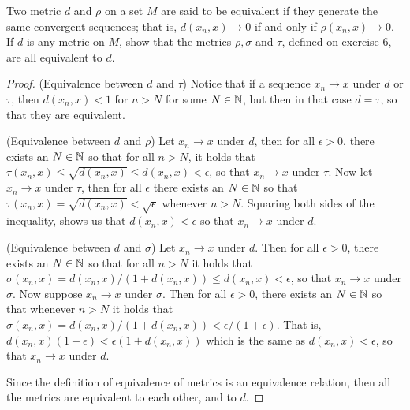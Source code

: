 \begin{exercise}{42}
Two metric $d$ and $\rho$ on a set $M$ are said to be equivalent if they generate the same convergent sequences; that is, $d(x_n,x)\to 0$ if and only if $\rho(x_n,x)\to 0$. If $d$ is any metric on $M$, show that the metrics $\rho,\sigma$ and $\tau$, defined on exercise 6, are all equivalent to $d$.
\end{exercise}
\begin{proof}
(Equivalence between $d$ and $\tau$) Notice that if a sequence $x_n\to x$ under $d$ or $\tau$, then $d(x_n,x)<1$ for $n>N$ for some $N\in\mathbb{N}$, but then in that case $d=\tau$, so that they are equivalent.

(Equivalence between $d$ and $\rho$) Let $x_n\to x$ under $d$, then for all $\epsilon>0$, there exists an $N\in\mathbb{N}$ so that for all $n>N$, it holds that $\tau(x_n,x)\leq \sqrt{d(x_n,x)}\leq d(x_n,x)<\epsilon$, so that $x_n\to x$ under $\tau$. Now let $x_n\to x$ under $\tau$, then for all $\epsilon$ there exists an $N\in\mathbb{N}$ so that $\tau(x_n,x) =\sqrt{d(x_n,x)} <\sqrt{\epsilon}$ whenever $n>N$. Squaring both sides of the inequality, shows us that $d(x_n,x)<\epsilon$ so that $x_n\to x$ under $d$.

(Equivalence between $d$ and $\sigma$) Let $x_n\to x$ under $d$. Then for all $\epsilon>0$, there exists an $N\in\mathbb{N}$ so that for all $n>N$ it holds that $\sigma(x_n,x) =d(x_n,x)/(1+d(x_n,x)) \leq d(x_n,x) <\epsilon$, so that $x_n\to x$ under $\sigma$. Now suppose $x_n\to x$ under $\sigma$. Then for all $\epsilon>0$, there exists an $N\in\mathbb{N}$ so that whenever $n>N$ it holds that $\sigma(x_n,x) =d(x_n,x)/(1+d(x_n,x)) <\epsilon/(1+\epsilon)$. That is, $d(x_n,x)(1+\epsilon)<\epsilon(1+d(x_n,x))$ which is the same as $d(x_n,x)<\epsilon$, so that $x_n\to x$ under $d$. 

Since the definition of equivalence of metrics is an equivalence relation, then all the metrics are equivalent to each other, and to $d$.
\end{proof} 

